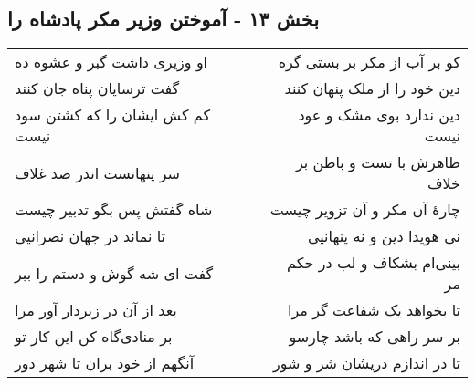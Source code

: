 \begin{center}
\section*{بخش ۱۳ - آموختن وزیر مکر پادشاه را}
\label{sec:sh013}
\begin{longtable}{l p{0.5cm} r}
او وزیری داشت گبر و عشوه ده
&&
کو بر آب از مکر بر بستی گره
\\
گفت ترسایان پناه جان کنند
&&
دین خود را از ملک پنهان کنند
\\
کم کش ایشان را که کشتن سود نیست
&&
دین ندارد بوی مشک و عود نیست
\\
سر پنهانست اندر صد غلاف
&&
ظاهرش با تست و باطن بر خلاف
\\
شاه گفتش پس بگو تدبیر چیست
&&
چارهٔ آن مکر و آن تزویر چیست
\\
تا نماند در جهان نصرانیی
&&
نی هویدا دین و نه پنهانیی
\\
گفت ای شه گوش و دستم را ببر
&&
بینی‌ام بشکاف و لب در حکم مر
\\
بعد از آن در زیردار آور مرا
&&
تا بخواهد یک شفاعت گر مرا
\\
بر منادی‌گاه کن این کار تو
&&
بر سر راهی که باشد چارسو
\\
آنگهم از خود بران تا شهر دور
&&
تا در اندازم دریشان شر و شور
\\
\end{longtable}
\end{center}
